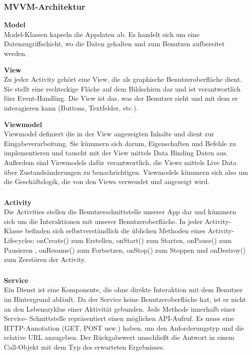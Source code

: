 \subsubsection{MVVM-Architektur}

\textbf{Model}\\
Model-Klassen kapseln die Appdaten ab. Es handelt sich um eine Datenzugriffschicht, wo die Daten gehalten und zum Benutzen aufbereitet werden.


\textbf{View}\\
Zu jeder Activity gehört eine View, die als graphische Benutzeroberfläche dient. Sie stellt eine rechteckige Fläche auf dem Bildschirm dar und ist verantwortlich fürs Event-Handling. Die View ist das, was der Benutzer sieht und mit dem er interagieren kann (Buttons, Textfelder, etc.).


\textbf{Viewmodel}\\
Viewmodel definiert die in der View angezeigten Inhalte und dient zur Eingabeverarbeitung. Sie kümmern sich darum, Eigenschaften und Befehle zu implementieren und tauscht mit der View mittels Data Binding Daten aus. Außerdem sind Viewmodels dafür verantwortlich, die Views mittels Live Data über Zustandsänderungen zu benachrichtigen. Viewmodels kümmern sich also um die Geschäftslogik, die von den Views verwendet und angezeigt wird.


\subsubsection{}   
\textbf{Activity}\\
Die Activities stellen die Benutzerschnittstelle unserer App dar und kümmern sich um die Interaktionen mit unserer Benutzeroberfläche. In jeder Activity-Klasse befinden sich selbstverständlich die üblichen Methoden eines Activity-Lifecycles: onCreate() zum Erstellen, onStart() zum Starten, onPause() zum Pausieren , onResume() zum Fortsetzen, onStop() zum Stoppen und onDestroy() zum Zerstören der Activity.

\subsubsection{} 
\textbf{Service}\\
Ein Dienst ist eine Komponente, die ohne direkte Interaktion mit dem Benutzer im Hintergrund abläuft. Da der Service keine Benutzeroberfläche hat, ist er nicht an den Lebenszyklus einer Aktivität gebunden.
Jede Methode innerhalb einer Service- Schnittstelle repräsentiert einen möglichen API-Aufruf. Es muss eine HTTP-Annotation (GET, POST usw.) haben, um den Anforderungstyp und die relative URL anzugeben. Der Rückgabewert umschließt die Antwort in einem Call-Objekt mit dem Typ des erwarteten Ergebnisses.


